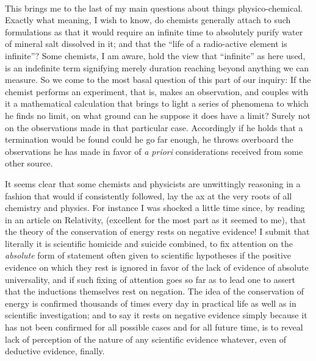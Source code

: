 \documentclass[a4paper, 11pt, oneside, polutonikogreek, english]{article}
\begin{document}
\paragraph{}
This brings me to the last of my main questions about things physico-chemical. Exactly what meaning, I wish to know, do chemists generally attach to such formulations as that it would require an infinite time to absolutely purify water of mineral salt dissolved in it; and that the ``life of a radio-active element is infinite''? Some chemists, I am aware, hold the view that ``infinite'' as here used, is an indefinite term signifying merely duration reaching beyond anything we can measure. So we come to the most basal question of this part of our inquiry: If the chemist performs an experiment, that is, makes an observation, and couples with it a mathematical calculation that brings to light a series of phenomena to which he finds no limit, on what ground can he suppose it does have a limit? Surely not on the observations made in that particular case. Accordingly if he holds that a termination would be found could he go far enough, he throws overboard the observations he has made in favor of \emph{a priori} considerations received from some other source.

It seems clear that some chemists and physicists are unwittingly reasoning in a fashion that would if consistently followed, lay the ax at the very roots of all chemistry and physics. For instance I was shocked a little time since, by reading in an article on Relativity, (excellent for the most part as it seemed to me), that the theory of the conservation of energy rests on negative evidence! I submit that literally it is scientific homicide and suicide combined, to fix attention on the \emph{absolute} form of statement often given to scientific hypotheses if the positive evidence on which they rest is ignored in favor of the lack of evidence of absolute universality, and if such fixing of attention goes so far as to lead one to assert that the inductions themselves rest on negation. The idea of the conservation of energy is confirmed thousands of times every day in practical life as well as in scientific investigation; and to say it rests on negative evidence simply because it has not been confirmed for all possible cases and for all future time, is to reveal lack of perception of the nature of any scientific evidence whatever, even of deductive evidence, finally.

\subsection{}
\end{document}

